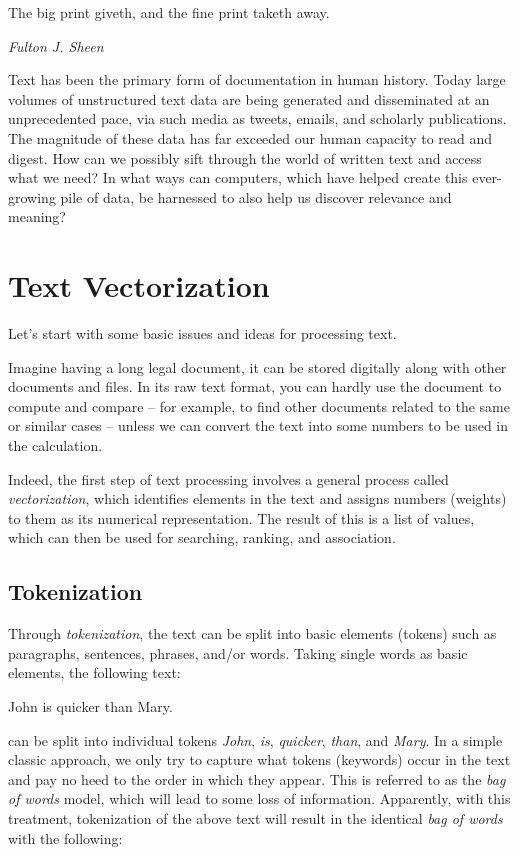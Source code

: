 \documentclass[
  letterpaper,
]{scrbook}
\begin{document}
The big print giveth, and the fine print taketh away.

\emph{Fulton J. Sheen}

Text has been the primary form of documentation in human history. Today
large volumes of unstructured text data are being generated and
disseminated at an unprecedented pace, via such media as tweets, emails,
and scholarly publications. The magnitude of these data has far exceeded
our human capacity to read and digest. How can we possibly sift through
the world of written text and access what we need? In what ways can
computers, which have helped create this ever-growing pile of data, be
harnessed to also help us discover relevance and meaning?

\section{Text Vectorization}\label{text-vectorization}

Let's start with some basic issues and ideas for processing text.

Imagine having a long legal document, it can be stored digitally along
with other documents and files. In its raw text format, you can hardly
use the document to compute and compare -- for example, to find other
documents related to the same or similar cases -- unless we can convert
the text into some numbers to be used in the calculation.

Indeed, the first step of text processing involves a general process
called \emph{vectorization}, which identifies elements in the text and
assigns numbers (weights) to them as its numerical representation. The
result of this is a list of values, which can then be used for
searching, ranking, and association.

\subsection{Tokenization}\label{tokenization}

Through \emph{tokenization}, the text can be split into basic elements
(tokens) such as paragraphs, sentences, phrases, and/or words. Taking
single words as basic elements, the following text:

John is quicker than Mary.

can be split into individual tokens \emph{John}, \emph{is},
\emph{quicker}, \emph{than}, and \emph{Mary}. In a simple classic
approach, we only try to capture what tokens (keywords) occur in the
text and pay no heed to the order in which they appear. This is referred
to as the \emph{bag of words} model, which will lead to some loss of
information. Apparently, with this treatment, tokenization of the above
text will result in the identical \emph{bag of words} with the
following:
\end{document}
